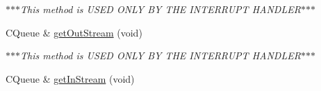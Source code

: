 \begin{DoxyCompactItemize}
\begin{DoxyCompactList}\small\item\em $\ast$$\ast$$\ast$\-This method is \-U\-S\-E\-D \-O\-N\-L\-Y \-B\-Y \-T\-H\-E \-I\-N\-T\-E\-R\-R\-U\-P\-T \-H\-A\-N\-D\-L\-E\-R$\ast$$\ast$$\ast$ \end{DoxyCompactList}\item 
\hypertarget{class_async_serial_port1_a826613a7951299d92cda2a7dac338636}{\-C\-Queue \& \hyperlink{class_async_serial_port1_a826613a7951299d92cda2a7dac338636}{get\-Out\-Stream} (void)}\label{class_async_serial_port1_a826613a7951299d92cda2a7dac338636}

\begin{DoxyCompactList}\small\item\em $\ast$$\ast$$\ast$\-This method is \-U\-S\-E\-D \-O\-N\-L\-Y \-B\-Y \-T\-H\-E \-I\-N\-T\-E\-R\-R\-U\-P\-T \-H\-A\-N\-D\-L\-E\-R$\ast$$\ast$$\ast$ \end{DoxyCompactList}\item 
\hypertarget{class_async_serial_port1_aca8bcbacddd2d46ca9460c3d9b232752}{\-C\-Queue \& \hyperlink{class_async_serial_port1_aca8bcbacddd2d46ca9460c3d9b232752}{get\-In\-Stream} (void)}\label{class_async_serial_port1_aca8bcbacddd2d46ca9460c3d9b232752}


\end{DoxyCompactItemize}
